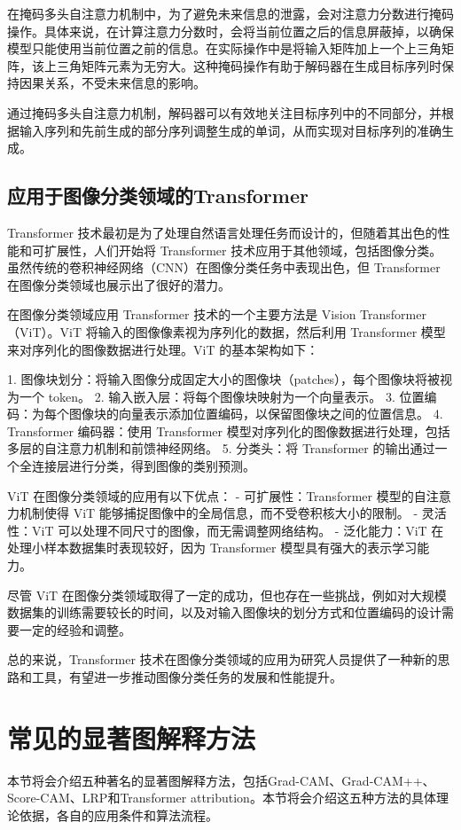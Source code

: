 在掩码多头自注意力机制中，为了避免未来信息的泄露，会对注意力分数进行掩码操作。具体来说，在计算注意力分数时，会将当前位置之后的信息屏蔽掉，以确保模型只能使用当前位置之前的信息。在实际操作中是将输入矩阵加上一个上三角矩阵，该上三角矩阵元素为无穷大。这种掩码操作有助于解码器在生成目标序列时保持因果关系，不受未来信息的影响。

通过掩码多头自注意力机制，解码器可以有效地关注目标序列中的不同部分，并根据输入序列和先前生成的部分序列调整生成的单词，从而实现对目标序列的准确生成。
\subsection{应用于图像分类领域的Transformer}
Transformer 技术最初是为了处理自然语言处理任务而设计的，但随着其出色的性能和可扩展性，人们开始将 Transformer 技术应用于其他领域，包括图像分类。虽然传统的卷积神经网络（CNN）在图像分类任务中表现出色，但 Transformer 在图像分类领域也展示出了很好的潜力。

在图像分类领域应用 Transformer 技术的一个主要方法是 Vision Transformer（ViT）。ViT 将输入的图像像素视为序列化的数据，然后利用 Transformer 模型来对序列化的图像数据进行处理。ViT 的基本架构如下：

1. 图像块划分：将输入图像分成固定大小的图像块（patches），每个图像块将被视为一个 token。
2. 输入嵌入层：将每个图像块映射为一个向量表示。
3. 位置编码：为每个图像块的向量表示添加位置编码，以保留图像块之间的位置信息。
4. Transformer 编码器：使用 Transformer 模型对序列化的图像数据进行处理，包括多层的自注意力机制和前馈神经网络。
5. 分类头：将 Transformer 的输出通过一个全连接层进行分类，得到图像的类别预测。

ViT 在图像分类领域的应用有以下优点：
- 可扩展性：Transformer 模型的自注意力机制使得 ViT 能够捕捉图像中的全局信息，而不受卷积核大小的限制。
- 灵活性：ViT 可以处理不同尺寸的图像，而无需调整网络结构。
- 泛化能力：ViT 在处理小样本数据集时表现较好，因为 Transformer 模型具有强大的表示学习能力。

尽管 ViT 在图像分类领域取得了一定的成功，但也存在一些挑战，例如对大规模数据集的训练需要较长的时间，以及对输入图像块的划分方式和位置编码的设计需要一定的经验和调整。

总的来说，Transformer 技术在图像分类领域的应用为研究人员提供了一种新的思路和工具，有望进一步推动图像分类任务的发展和性能提升。

\section{常见的显著图解释方法}
本节将会介绍五种著名的显著图解释方法，包括Grad-CAM、Grad-CAM++、Score-CAM、LRP和Transformer attribution。本节将会介绍这五种方法的具体理论依据，各自的应用条件和算法流程。 
